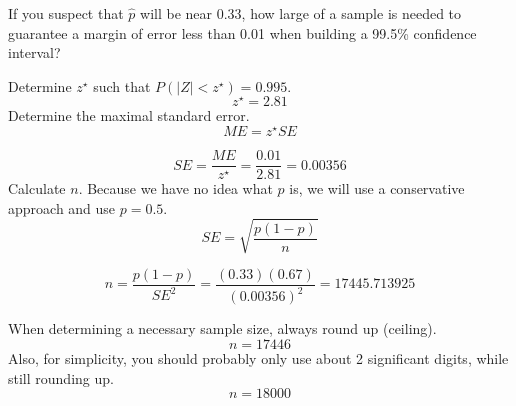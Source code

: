 
\begin{question}
If you suspect that \(\hat{p}\) will be near 0.33, how large of a sample
is needed to guarantee a margin of error less than 0.01 when building a
99.5\% confidence interval?
\end{question}

\begin{solution}
Determine \(z^\star\) such that \(P(|Z|<z^\star) = 0.995\).
\[z^\star = 2.81\] Determine the maximal standard error.
\[ME = z^\star SE \]

\[SE = \frac{ME}{z^\star} = \frac{0.01}{2.81} = 0.00356 \] Calculate
\(n\). Because we have no idea what \(p\) is, we will use a conservative
approach and use \(p=0.5\). \[SE = \sqrt{\frac{p(1-p)}{n}}\]

\[n = \frac{p(1-p)}{SE^2} = \frac{(0.33)(0.67)}{(0.00356)^2} = 17445.713925\]

When determining a necessary sample size, always round up (ceiling).
\[n = 17446 \] Also, for simplicity, you should probably only use about
2 significant digits, while still rounding up. \[n = 18000 \]
\end{solution}

